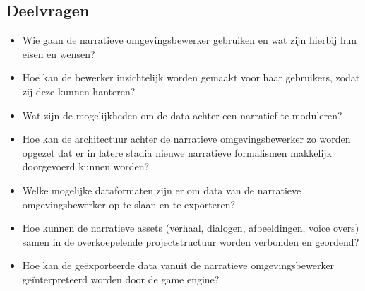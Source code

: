 \documentclass{report}
\begin{document}
\subsection{Deelvragen} %
\begin{itemize}
\item Wie gaan de narratieve omgevingsbewerker gebruiken en wat zijn hierbij hun eisen en wensen?
\item Hoe kan de bewerker inzichtelijk worden gemaakt voor haar gebruikers, zodat zij deze kunnen hanteren?
\item Wat zijn de mogelijkheden om de data achter een narratief te moduleren?
\item Hoe kan de architectuur achter de narratieve omgevingsbewerker zo worden opgezet dat er in latere stadia nieuwe narratieve formalismen makkelijk doorgevoerd kunnen worden?
\item Welke mogelijke dataformaten zijn er om data van de narratieve omgevingsbewerker op te slaan en te exporteren?
\item Hoe kunnen de narratieve assets (verhaal, dialogen, afbeeldingen, voice overs) samen in de overkoepelende projectstructuur worden verbonden en geordend?
\item Hoe kan de ge{\"e}xporteerde data vanuit de narratieve omgevingsbewerker ge{\"i}nterpreteerd worden door de game engine?
\end{itemize}
\end{document}
